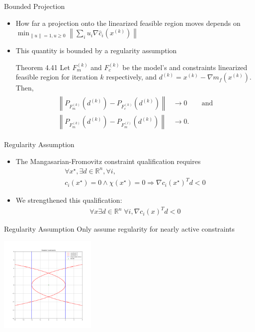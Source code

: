 \documentclass{beamer}
\newcommand{\Rn}{\mathbb R ^ {n}}
\newcommand{\xk}{{{x}^{(k)}}}
\newcommand{\neggrad}{d^{(k)}}
\begin{document}
\begin{frame}{Bounded Projection}
	\begin{itemize}
		\item How far a projection onto the linearized feasible region moves depends on
		$
			\min_{\|u\| = 1, u \ge 0} \left\|\sum_{i} u_i \nabla \hat c_i\left(\xk\right)\right\|
		$
		\item This quantity is bounded by a regularity assumption
		\begin{block}{Theorem 4.41}
			Let $F_m^{(k)}$ and $F_c^{(k)}$ be the model's and constraints linearized feasible region for iteration $k$ respectively,
			and $\neggrad = \xk - \nabla m_f\left(\xk\right)$. Then,
			\begin{align*}
				\begin{array}{ccc}
					\left\|P_{F_m^{(k)}}\left(\neggrad\right)
					-  P_{F_c^{(k)}}\left(\neggrad\right)\right\| & \to 0 & \quad \textrm{and} \\
					\left\|P_{F_m^{(k)}}\left(\neggrad\right)
					-  P_{F_m^{(l)}}\left(\neggrad\right)\right\| & \to 0. & 
				\end{array}
			\end{align*}
		\end{block}
	\end{itemize}
\end{frame}



\begin{frame}{Regularity Assumption}
\begin{itemize}
\item The Mangasarian-Fromovitz constraint qualification requires
\begin{align*}
\forall x^{\star}, \exists d \in \Rn, \forall i, \\
c_i\left(x^{\star}\right)=0 \wedge \chi\left(x^{\star}\right) = 0 \Longrightarrow \nabla c_i\left(x^{\star}\right)^T d < 0 
\end{align*}
\item We strengthened this qualification:
\begin{align*}
\forall x \exists d \in \Rn\; \forall i, \nabla c_i\left(x\right)^T d < 0
\end{align*}
\end{itemize}
\end{frame}


\begin{frame}{Regularity Assumption}
	Only assume regularity for nearly active constraints
	\begin{center}
		\includegraphics[width=175px]{images/local_regularity.png}
	\end{center}
\end{frame}
\end{document}
